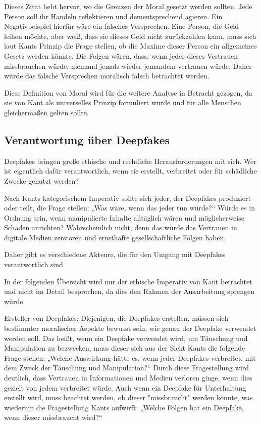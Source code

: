 \documentclass[a4paper,12pt]{article}
\begin{document}
Dieses Zitat hebt hervor, wo die Grenzen der Moral gesetzt werden sollten. 
Jede Person soll ihr Handeln reflektieren und dementsprechend agieren. Ein Negativbeispiel hierfür wäre ein falsches Versprechen. 
Eine Person, die Geld leihen möchte, aber weiß, dass sie dieses Geld nicht zurückzahlen kann, muss sich laut Kants Prinzip die Frage stellen, 
ob die Maxime dieser Person ein allgemeines Gesetz werden könnte. Die Folgen wären, dass, wenn jeder dieses Vertrauen missbrauchen würde, niemand jemals wieder jemandem vertrauen würde. 
Daher würde das falsche Versprechen moralisch falsch betrachtet werden. \cite{KantMetaphysik}

Diese Definition von Moral wird für die weitere Analyse in Betracht gezogen, da sie von Kant als universelles Prinzip formuliert wurde und für alle Menschen gleichermaßen gelten sollte.

\subsection{Verantwortung über Deepfakes}
Deepfakes bringen große ethische und rechtliche Herausforderungen mit sich. Wer ist eigentlich dafür verantwortlich, wenn sie erstellt, verbreitet oder für schädliche Zwecke genutzt werden?

Nach Kants kategorischem Imperativ sollte sich jeder, der Deepfakes produziert oder teilt, 
die Frage stellen: „Was wäre, wenn das jeder tun würde?“ Würde es in Ordnung sein, wenn manipulierte Inhalte alltäglich wären und möglicherweise Schaden anrichten? 
Wahrscheinlich nicht, denn das würde das Vertrauen in digitale Medien zerstören und ernsthafte gesellschaftliche Folgen haben. \cite{KantMetaphysik}

Daher gibt es verschiedene Akteure, die für den Umgang mit Deepfakes verantwortlich sind.

In der folgenden Übersicht wird nur der ethische Imperativ von Kant betrachtet und nicht im Detail besprochen, da dies den Rahmen der Ausarbeitung sprengen würde.

Ersteller von Deepfakes:
Diejenigen, die Deepfakes erstellen, müssen sich bestimmter moralischer Aspekte bewusst sein, wie genau der Deepfake verwendet werden soll. 
Das heißt, wenn ein Deepfake verwendet wird, um Täuschung und Manipulation zu bezwecken, 
muss dieser sich aus der Sicht Kants die folgende Frage stellen: „Welche Auswirkung hätte es, wenn jeder Deepfakes verbreitet, mit dem Zweck der Täuschung und Manipulation?“ 
Durch diese Fragestellung wird deutlich, dass Vertrauen in Informationen und Medien verloren ginge, wenn dies gezielt von jedem verbreitet würde. Auch wenn ein Deepfake für Unterhaltung erstellt wird, muss beachtet werden, 
ob dieser "missbraucht" werden könnte, was wiederum die Fragestellung Kants aufwirft: „Welche Folgen hat ein Deepfake, wenn dieser missbraucht wird?“\cite{IJS2025}\cite{KantMetaphysik}
\end{document}
